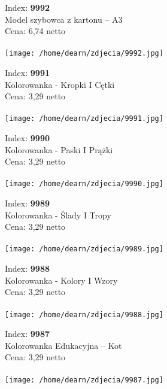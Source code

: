 {Index: \textbf{9992}\\
Model szybowca z kartonu – A3\\
Cena: 6,74 netto   \\\\  \texttt{[image: /home/dearn/zdjecia/9992.jpg]}}\newline\newline

{Index: \textbf{9991}\\
Kolorowanka - Kropki I Cętki \\
Cena: 3,29 netto   \\\\  \texttt{[image: /home/dearn/zdjecia/9991.jpg]}}\newline\newline

{Index: \textbf{9990}\\
Kolorowanka - Paski I Prążki \\
Cena: 3,29 netto   \\\\  \texttt{[image: /home/dearn/zdjecia/9990.jpg]}}\newline\newline

{Index: \textbf{9989}\\
Kolorowanka - Ślady I Tropy \\
Cena: 3,29 netto   \\\\  \texttt{[image: /home/dearn/zdjecia/9989.jpg]}}\newline\newline

{Index: \textbf{9988}\\
Kolorowanka - Kolory I Wzory \\
Cena: 3,29 netto   \\\\  \texttt{[image: /home/dearn/zdjecia/9988.jpg]}}\newline\newline

{Index: \textbf{9987}\\
Kolorowanka Edukacyjna – Kot \\
Cena: 3,29 netto   \\\\  \texttt{[image: /home/dearn/zdjecia/9987.jpg]}}\newline\newline

